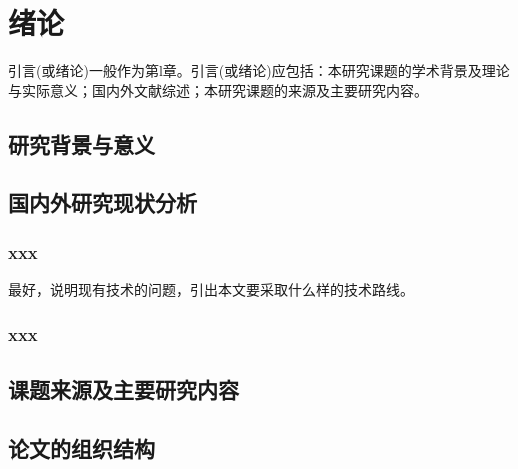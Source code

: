\chapter{绪论}
 引言(或绪论)一般作为第l章。引言(或绪论)应包括：本研究课题的学术背景及理论与实际意义；国内外文献综述；本研究课题的来源及主要研究内容。

\section{研究背景与意义}


\section{国内外研究现状分析}
\subsection{xxx}

最好，说明现有技术的问题，引出本文要采取什么样的技术路线。

\subsection{xxx}

\section{课题来源及主要研究内容}


\section{论文的组织结构}

